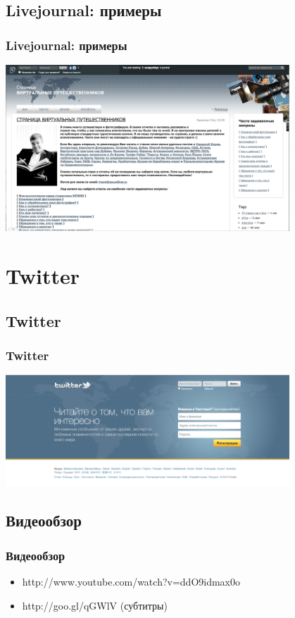 \documentclass[compress,red]{beamer}
\begin{document}
\subsection{Livejournal: примеры}
\begin{frame}
  \frametitle{Livejournal: примеры}
	\centerline{\includegraphics[width=0.8\textwidth]{images/sergeydolya-lj.png}}
\end{frame}

\section{Twitter}
\subsection{Twitter}
\begin{frame}
  \frametitle{Twitter}
	\centerline{\includegraphics[width=0.8\textwidth]{images/twitter.png}}
\end{frame}

\subsection{Видеообзор}
\begin{frame}
  \frametitle{Видеообзор}
	\begin{itemize}
	\item http://www.youtube.com/watch?v=ddO9idmax0o
	\item http://goo.gl/qGWlV (субтитры)
	\end{itemize}
\end{frame}
\end{document}
